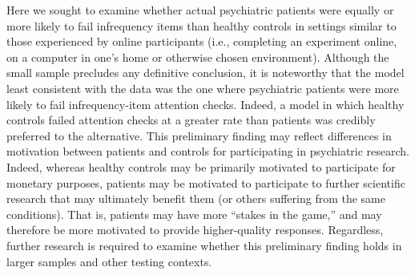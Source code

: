\documentclass[a4paper,notitlepage,12pt]{article}
\begin{document}
Here we sought to examine whether actual psychiatric patients were equally or more likely to fail infrequency items than healthy controls in settings similar to those experienced by online participants (i.e., completing an experiment online, on a computer in one's home or otherwise chosen environment). Although the small sample precludes any definitive conclusion, it is noteworthy that the model least consistent with the data was the one where psychiatric patients were more likely to fail infrequency-item attention checks. Indeed, a model in which healthy controls failed attention checks at a greater rate than patients was credibly preferred to the alternative. This preliminary finding may reflect differences in motivation between patients and controls for participating in psychiatric research. Indeed, whereas healthy controls may be primarily motivated to participate for monetary purposes, patients may be motivated to participate to further scientific research that may ultimately benefit them (or others suffering from the same conditions). That is, patients may have more ``stakes in the game,'' and may therefore be more motivated to provide higher-quality responses. Regardless, further research is required to examine whether this preliminary finding holds in larger samples and other testing contexts. 

\printbibliography[title=Supplementary References]
\end{document}
